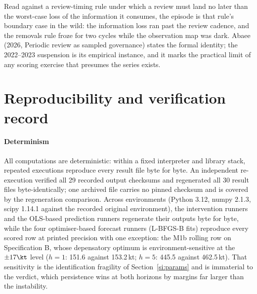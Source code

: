 Read against a review-timing rule under which a review must land no later than the worst-case loss of the information it consumes, the episode is that rule's boundary case in the wild: the information loss ran past the review cadence, and the removals rule froze for two cycles while the observation map was dark. Abaee (2026, Periodic review as sampled governance) states the formal identity; the 2022--2023 suspension is its empirical instance, and it marks the practical limit of any scoring exercise that presumes the series exists.

\FloatBarrier
\section{Reproducibility and verification record}\label{si:repro}

\paragraph{Determinism} All computations are deterministic: within a fixed interpreter and library stack, repeated executions reproduce every result file byte for byte. An independent re-execution verified all 29 recorded output checksums and regenerated all 30 result files byte-identically; one archived file carries no pinned checksum and is covered by the regeneration comparison. Across environments (Python 3.12, numpy 2.1.3, scipy 1.14.1 against the recorded original environment), the intervention runners and the OLS-based prediction runners regenerate their outputs byte for byte, while the four optimiser-based forecast runners (L-BFGS-B fits) reproduce every scored row at printed precision with one exception: the M1b rolling row on Specification B, whose depensatory optimum is environment-sensitive at the $\pm17\kt$ level ($h=1$: 151.6 against 153.2\,kt; $h=5$: 445.5 against 462.5\,kt). That sensitivity is the identification fragility of Section~\ref{si:params} and is immaterial to the verdict, which persistence wins at both horizons by margins far larger than the instability.


